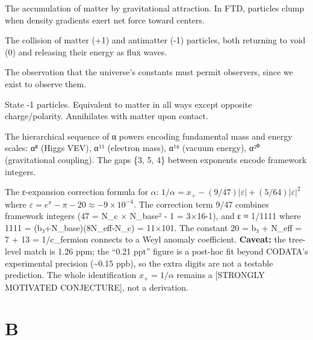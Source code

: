 \documentclass[
  11pt,
  letterpaper,
  twoside,
  openright]{book}
\providecommand{\tightlist}{%
  \setlength{\itemsep}{0pt}\setlength{\parskip}{0pt}}
\begin{document}
\begin{description}
\tightlist
\item[\textbf{Accretion}]
The accumulation of matter by gravitational attraction. In FTD,
particles clump when density gradients exert net force toward centers.
\item[\textbf{Annihilation}]
The collision of matter (+1) and antimatter (-1) particles, both
returning to void (0) and releasing their energy as flux waves.
\item[\textbf{Anthropic Principle}]
The observation that the universe's constants must permit observers,
since we exist to observe them.
\item[\textbf{Antimatter}]
State -1 particles. Equivalent to matter in all ways except opposite
charge/polarity. Annihilates with matter upon contact.
\item[\textbf{Alpha Power Ladder}]
The hierarchical sequence of α powers encoding fundamental mass and
energy scales: α⁸ (Higgs VEV), α¹¹ (electron mass), α¹⁶ (vacuum energy),
α²⁰ (gravitational coupling). The gaps \{3, 5, 4\} between exponents
encode framework integers.
\item[\textbf{Alpha Precision Formula}]
The ε-expansion correction formula for \(\alpha\):
\(1/\alpha = x_+ - (9/47)|\varepsilon| + (5/64)|\varepsilon|^2\) where
\(\varepsilon = e^\pi - \pi - 20 \approx -9 \times 10^{-4}\). The
correction term 9/47 combines framework integers (47 = N\_c × N\_base² -
1 = 3×16-1), and \textbar ε\textbar{} ≈ 1/1111 where 1111 =
(b₃+N\_base)(8N\_eff-N\_c) = 11×101. The constant 20 = b₃ + N\_eff = 7 +
13 = 1/c\_fermion connects to a Weyl anomaly coefficient.
\textbf{Caveat:} the tree-level match is 1.26 ppm; the ``0.21 ppt''
figure is a post-hoc fit beyond CODATA's experimental precision
(\textasciitilde0.15 ppb), so the extra digits are not a testable
prediction. The whole identification \(x_+ = 1/\alpha\) remains a
{[}STRONGLY MOTIVATED CONJECTURE{]}, not a derivation.
\end{description}

\section{B}\label{b}
\end{document}
